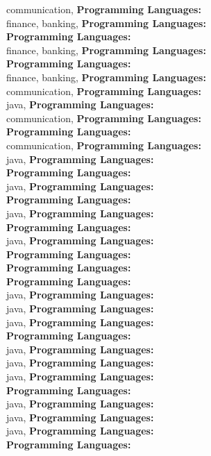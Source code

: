 communication, \textbf{Programming Languages:} \\
finance, banking, \textbf{Programming Languages:} \\
\textbf{Programming Languages:} \\
finance, banking, \textbf{Programming Languages:} \\
\textbf{Programming Languages:} \\
finance, banking, \textbf{Programming Languages:} \\
communication, \textbf{Programming Languages:} \\
java, \textbf{Programming Languages:} \\
communication, \textbf{Programming Languages:} \\
\textbf{Programming Languages:} \\
communication, \textbf{Programming Languages:} \\
java, \textbf{Programming Languages:} \\
\textbf{Programming Languages:} \\
java, \textbf{Programming Languages:} \\
\textbf{Programming Languages:} \\
java, \textbf{Programming Languages:} \\
\textbf{Programming Languages:} \\
java, \textbf{Programming Languages:} \\
\textbf{Programming Languages:} \\
\textbf{Programming Languages:} \\
\textbf{Programming Languages:} \\
java, \textbf{Programming Languages:} \\
java, \textbf{Programming Languages:} \\
java, \textbf{Programming Languages:} \\
\textbf{Programming Languages:} \\
java, \textbf{Programming Languages:} \\
java, \textbf{Programming Languages:} \\
java, \textbf{Programming Languages:} \\
\textbf{Programming Languages:} \\
java, \textbf{Programming Languages:} \\
java, \textbf{Programming Languages:} \\
java, \textbf{Programming Languages:} \\
\textbf{Programming Languages:} \\
